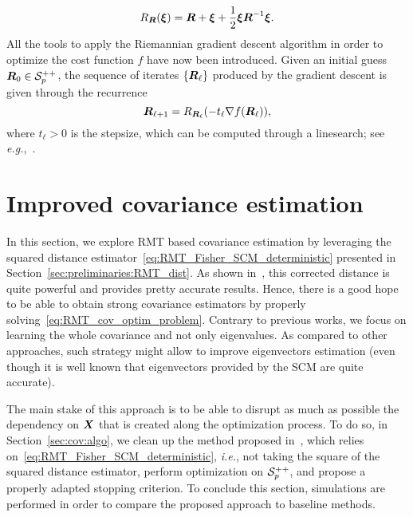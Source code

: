 \documentclass{article}
\theoremstyle{plain}
\theoremstyle{definition}
\theoremstyle{remark}
\begin{document}
\begin{equation}
    R_{\boldsymbol{R}}(\boldsymbol{\xi}) = \boldsymbol{R} + \boldsymbol{\xi} + \frac12\boldsymbol{\xi}\boldsymbol{R}^{-1}\boldsymbol{\xi}.
\label{eq:retr}
\end{equation}
%
All the tools to apply the Riemannian gradient descent algorithm in order to optimize the cost function $f$ have now been introduced.
Given an initial guess $\boldsymbol{R}_0\in\mathcal{S}^{++}_{p}$, the sequence of iterates $\{\boldsymbol{R}_{\ell}\}$ produced by the gradient descent is given through the recurrence
\begin{equation}
    \boldsymbol{R}_{\ell+1} = R_{\boldsymbol{R}_\ell}(-t_\ell\nabla f(\boldsymbol{R}_\ell)),
\label{eq:RgradDescent}
\end{equation}
where $t_\ell>0$ is the stepsize, which can be computed through a linesearch; see \emph{e.g.},~\cite{absil2009optimization}.






\section{Improved covariance estimation}
\label{sec:cov}

In this section, we explore RMT based covariance estimation by leveraging the squared distance estimator~\eqref{eq:RMT_Fisher_SCM_deterministic} presented in Section~\ref{sec:preliminaries:RMT_dist}.
%
As shown in~\cite{couillet2019random}, this corrected distance is quite powerful and provides pretty accurate results.
Hence, there is a good hope to be able to obtain strong covariance estimators by properly solving~\eqref{eq:RMT_cov_optim_problem}.
%
Contrary to previous works, we focus on learning the whole covariance and not only eigenvalues.
As compared to other approaches, such strategy might allow to improve eigenvectors estimation (even though it is well known that eigenvectors provided by the SCM are quite accurate).

The main stake of this approach is to be able to disrupt as much as possible the dependency on $\boldsymbol{X}$ that is created along the optimization process.
To do so, in Section~\ref{sec:cov:algo}, we clean up the method proposed in~\cite{tiomoko2019random}, which relies on~\eqref{eq:RMT_Fisher_SCM_deterministic}, \emph{i.e.}, not taking the square of the squared distance estimator, perform optimization on $\mathcal{S}^{++}_{p}$, and propose a properly adapted stopping criterion.
%
To conclude this section, simulations are performed in order to compare the proposed approach to baseline methods.
\end{document}
